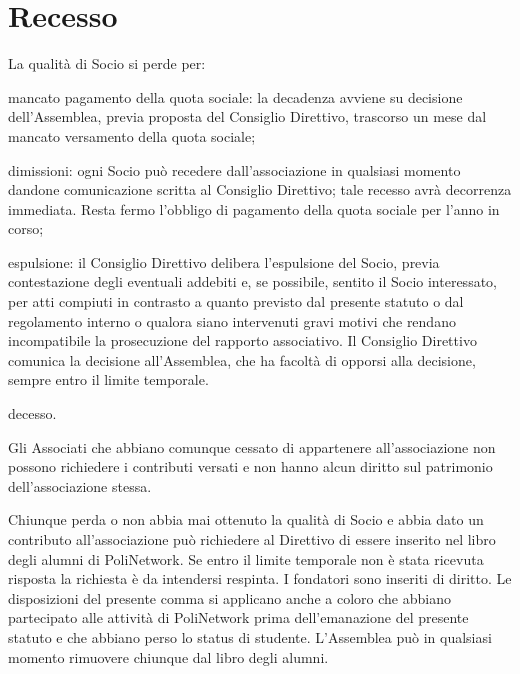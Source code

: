 \documentclass[legalpaper, 11pt]{exam}
\let\tempone\enumerate
\let\temptwo\endenumerate
\renewenvironment{enumerate}{\tempone\addtolength{\itemsep}{-0.45\baselineskip}}{\temptwo}
\begin{document}
{\section{Recesso}
\begin{enumerate}
 \item La qualità di Socio si perde per:
 \vspace{-5pt}
 \begin{enumerate}
  \item mancato pagamento della quota sociale: la decadenza avviene su decisione dell’Assemblea, previa proposta del Consiglio Direttivo, trascorso un mese dal mancato versamento della quota sociale;
  \item dimissioni: ogni Socio può recedere dall’associazione in qualsiasi momento dandone comunicazione scritta al Consiglio Direttivo; tale recesso avrà decorrenza immediata. Resta fermo l’obbligo di pagamento della quota sociale per l’anno in corso;
  \item espulsione: il Consiglio Direttivo delibera l’espulsione del Socio, previa contestazione degli eventuali addebiti e, se possibile, sentito il Socio interessato, per atti compiuti in contrasto a quanto previsto dal presente statuto o dal regolamento interno o qualora siano intervenuti gravi motivi che rendano incompatibile la prosecuzione del rapporto associativo. Il Consiglio Direttivo comunica la decisione all’Assemblea, che ha facoltà di opporsi alla decisione, sempre entro il limite temporale.
  \item decesso.
 \end{enumerate}

 \item Gli Associati che abbiano comunque cessato di appartenere all’associazione non possono richiedere i contributi versati e non hanno alcun diritto sul patrimonio dell’associazione stessa.
 \item Chiunque perda o non abbia mai ottenuto la qualità di Socio e abbia dato un contributo all’associazione può richiedere al Direttivo di essere inserito nel libro degli alumni di PoliNetwork. Se entro il limite temporale non è stata ricevuta risposta la richiesta è da intendersi respinta. I fondatori sono inseriti di diritto. Le disposizioni del presente comma si applicano anche a coloro che abbiano partecipato alle attività di PoliNetwork prima dell’emanazione del presente statuto e che abbiano perso lo status di studente. L'Assemblea può in qualsiasi momento rimuovere chiunque dal libro degli alumni.
\end{enumerate}

}
\end{document}
